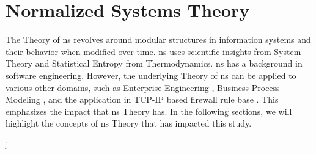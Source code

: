 \section{Normalized Systems Theory} \label{sec_ns_theory}

The Theory of \gls{ns} revolves around modular structures in information systems and their
behavior when modified over time. \gls{ns} uses scientific insights from System Theory and
Statistical Entropy from Thermodynamics. \gls{ns} has a background in software
engineering. However, the underlying Theory of \gls{ns} can be applied to various other
domains, such as Enterprise Engineering \parencite{huysmans_towards_2013}, Business
Process Modeling \parencite{van_nuel_towards_2011}, and the application in TCP-IP based
firewall rule base \parencite{haerens_evolvability_2021}. This emphasizes the impact that
\gls{ns} Theory has. In the following sections, we will highlight the concepts of
\gls{ns} Theory that has impacted this study.





j